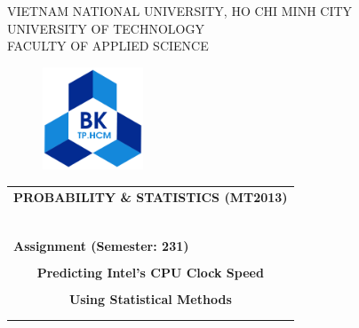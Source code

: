 \documentclass[12pt]{article}
\begin{document}
\begin{titlepage}
\begin{center}
VIETNAM NATIONAL UNIVERSITY, HO CHI MINH CITY \\
UNIVERSITY OF TECHNOLOGY \\
FACULTY OF APPLIED SCIENCE
\end{center}

\vspace{1cm}

\begin{figure}[h!]
\begin{center}
\includegraphics[width=3cm]{graphics/hcmut.png}
\end{center}
\end{figure}


\begin{center}
\begin{tabular}{c}
\multicolumn{1}{l}{\textbf{{\Large PROBABILITY \& STATISTICS (MT2013)}}}\\
~~\\
\hline
\\
\multicolumn{1}{l}{\textbf{{Assignment (Semester: 231)}}}\\
\\
\textbf{{\Huge Predicting Intel's CPU Clock Speed}}\\
\\
\textbf{{\Huge Using Statistical Methods}}\\[10pt]

\multicolumn{1}{l}{\textbf{{}}}\\
\\
\hline
\end{tabular}
\end{center}

\vspace{0.5cm}


\end{titlepage}
\end{document}
